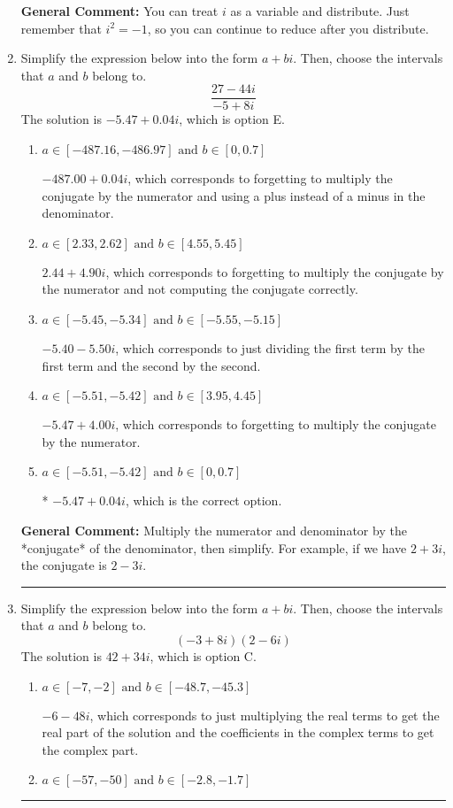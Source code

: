 \documentclass{extbook}[14pt]
\newcommand{\litem}[1]{\item #1

\rule{\textwidth}{0.4pt}}
\begin{document}
\begin{enumerate}
{\textbf{General Comment:} You can treat $i$ as a variable and distribute. Just remember that $i^2=-1$, so you can continue to reduce after you distribute.
}
\litem{
Simplify the expression below into the form $a+bi$. Then, choose the intervals that $a$ and $b$ belong to.
\[ \frac{27 - 44 i}{-5 + 8 i} \]The solution is \( -5.47  + 0.04 i \), which is option E.\begin{enumerate}[label=\Alph*.]
\item \( a \in [-487.16, -486.97] \text{ and } b \in [0, 0.7] \)

 $-487.00  + 0.04 i$, which corresponds to forgetting to multiply the conjugate by the numerator and using a plus instead of a minus in the denominator.
\item \( a \in [2.33, 2.62] \text{ and } b \in [4.55, 5.45] \)

 $2.44  + 4.90 i$, which corresponds to forgetting to multiply the conjugate by the numerator and not computing the conjugate correctly.
\item \( a \in [-5.45, -5.34] \text{ and } b \in [-5.55, -5.15] \)

 $-5.40  - 5.50 i$, which corresponds to just dividing the first term by the first term and the second by the second.
\item \( a \in [-5.51, -5.42] \text{ and } b \in [3.95, 4.45] \)

 $-5.47  + 4.00 i$, which corresponds to forgetting to multiply the conjugate by the numerator.
\item \( a \in [-5.51, -5.42] \text{ and } b \in [0, 0.7] \)

* $-5.47  + 0.04 i$, which is the correct option.
\end{enumerate}

\textbf{General Comment:} Multiply the numerator and denominator by the *conjugate* of the denominator, then simplify. For example, if we have $2+3i$, the conjugate is $2-3i$.
}
\litem{
Simplify the expression below into the form $a+bi$. Then, choose the intervals that $a$ and $b$ belong to.
\[ (-3 + 8 i)(2 - 6 i) \]The solution is \( 42 + 34 i \), which is option C.\begin{enumerate}[label=\Alph*.]
\item \( a \in [-7, -2] \text{ and } b \in [-48.7, -45.3] \)

 $-6 - 48 i$, which corresponds to just multiplying the real terms to get the real part of the solution and the coefficients in the complex terms to get the complex part.
\item \( a \in [-57, -50] \text{ and } b \in [-2.8, -1.7] \)


\end{enumerate}}
\end{enumerate}
\end{document}
